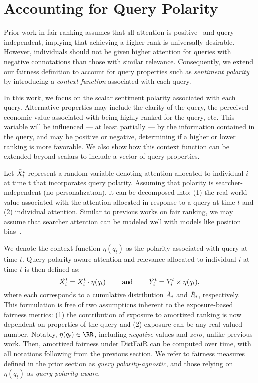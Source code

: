 \section{Accounting for Query Polarity}
\newcommand{\polarity}{\eta}
\label{sec:accounting_query_polarity}
Prior work in fair ranking assumes that all attention is positive~\cite{biega2018equity,singh2018fairness} and query independent, implying that achieving a higher rank is universally desirable. However, individuals should not be given higher attention for queries with negative connotations than those with similar relevance. Consequently, we extend our fairness definition to account for query properties such as \emph{sentiment polarity} by introducing a {\em context function} associated with each query. 

In this work, we focus on the scalar sentiment polarity associated with each query. Alternative properties may include the clarity of the query, the perceived economic value associated with being highly ranked for the query, etc. This variable will be influenced --- at least partially --- by the information contained in the query, and may be positive or negative, determining if a higher or lower ranking is more favorable. We also show how this context function can be extended beyond scalars to include a vector of query properties.

Let $\Tilde{X}_i^t$ represent a random variable denoting attention allocated to individual $i$ at time t that incorporates query polarity. Assuming that polarity is searcher-independent (no personalization), it can be decomposed into: (1) the real-world value associated with the attention allocated in response to a query at time $t$ and (2) individual attention. Similar to previous works on fair ranking, we may assume that searcher attention can be modeled well with models like position bias~\cite{chuklin2015click,craswell2008experimental}. %

We denote the context function $\polarity(q_t)$ as the polarity associated with query at time $t$. Query polarity-aware attention and relevance allocated to individual $i$ at time $t$ is then defined as:
\begin{equation}
    \Tilde{X}_i^t = X_i^t \cdot \polarity(q_t) \quad \quad \text{ and } \quad \quad \Tilde{Y}_i^t = Y_i^t \times \polarity(q_t),
\end{equation}
where each corresponds to a cumulative distribution $\Tilde{A}_i$ and $\Tilde{R}_i$, respectively. This formulation is free of two assumptions inherent to the exposure-based fairness metrics: (1) the contribution of exposure to amortized ranking is now dependent on properties of the query and (2) exposure can be any real-valued number. Notably, $\eta(q_t) \in \RR$, including \emph{negative} values and \emph{zero}, unlike previous work. Then, amortized fairness under DistFaiR can be computed over time, with all notations following from the previous section. %
We refer to fairness measures defined in the prior section as \emph{query polarity-agnostic}, and those relying on $\eta(q_t)$ as \emph{query polarity-aware}.

